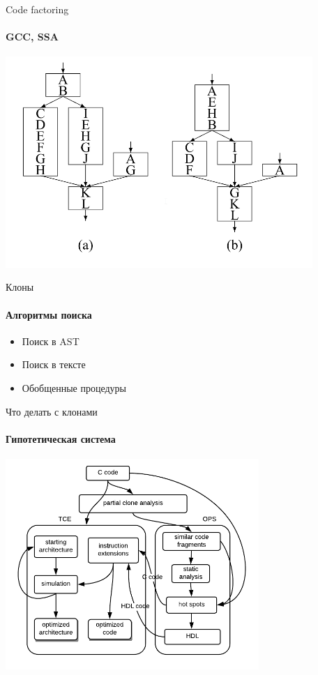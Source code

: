 \documentclass{beamer}              %
\begin{document}
\begin{frame}{Code factoring}
  \framesubtitle{GCC, SSA}
  \nocite{Loki2004}
  \includegraphics[height=8cm]{img/CodeFactoring.png}
\end{frame}

  \nocite{Zhao2005}
% 


\begin{frame}{Клоны}
  \framesubtitle{Алгоритмы поиска}
   \begin{itemize}
          \item Поиск в AST
          \item Поиск в тексте
          \item Обобщенные процедуры
  	\end{itemize}
  \nocite{MaFeiTreePatternMatching}
  
\end{frame}

%  

\begin{frame}{Что делать с клонами}
  \framesubtitle{Гипотетическая система}
  \includegraphics[height=8cm]{img/CodesignFlow.png}
\end{frame}
\end{document}
